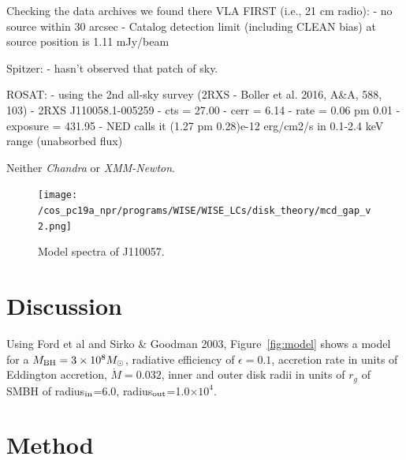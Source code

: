\documentclass{nature}
\begin{document}
Checking the data archives we found 
there 
VLA FIRST (i.e., 21 cm radio):
- no source within 30 arcsec
- Catalog detection limit (including CLEAN bias) at source position is 1.11 mJy/beam

Spitzer:
- hasn't observed that patch of sky.

ROSAT: 
- using the 2nd all-sky survey (2RXS - Boller et al. 2016, A&A, 588, 103)
- 2RXS J110058.1-005259
- cts = 27.00 
- cerr = 6.14
- rate = 0.06 pm 0.01
- exposure = 431.95
- NED calls it (1.27 pm 0.28)e-12 erg/cm2/s in 0.1-2.4 keV range (unabsorbed flux)

Neither {\it Chandra} or {\it XMM-Newton}. 




\begin{figure}
  \texttt{[image: /cos\_pc19a\_npr/programs/WISE/WISE\_LCs/disk\_theory/mcd\_gap\_v2.png]}
  \centering
  \caption[]{Model spectra of J110057. }
  \label{fig:J110057_diskmodel}
\end{figure}
\section{Discussion}   %
Using Ford et al and Sirko \& Goodman 2003, 
Figure~\ref{fig:model} shows a model for a $M_{\rm BH}=3\times 10^{8} M_{\odot}$, 
radiative efficiency of $\epsilon=0.1$, accretion rate in units of Eddington accretion, 
$\dot{M}=0.032$, inner and outer disk radii in units of $r_g$ of SMBH of 
radius$_{\rm in}$=6.0, radius$_{\rm out}$=1.0$\times 10^{4}$. 
\section{Method}






\end{document}
